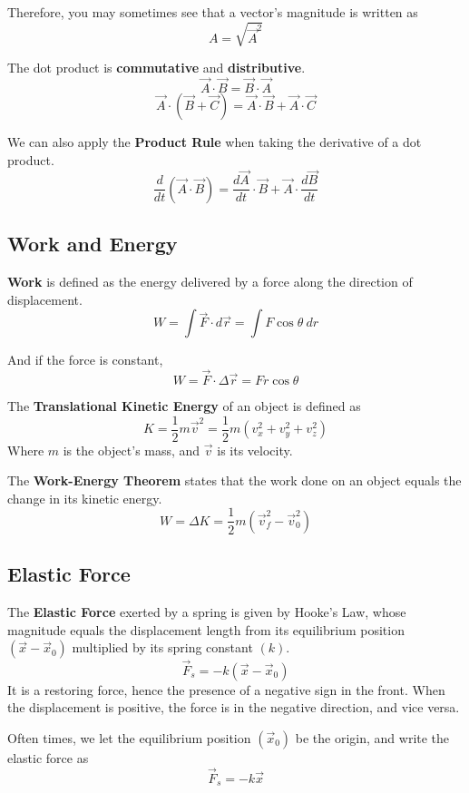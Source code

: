 \documentclass[11pt]{article}
\theoremstyle{gangnamstyle}{\newtheorem{definition}{Definition}[]}
\theoremstyle{gangnamstyle}{\newtheorem{example}{Example}[]}
\theoremstyle{gangnamstyle}{\newtheorem{problem}{Problem}[]}
\begin{document}
Therefore, you may sometimes see that a vector's magnitude is written as
\[ A = \sqrt{\Vec{A}^2} \]

The dot product is \textbf{commutative} and \textbf{distributive}. 
\[ \Vec{A} \cdot \Vec{B} = \Vec{B} \cdot \Vec{A} \]
\[ \Vec{A} \cdot (\Vec{B} + \Vec{C}) = \Vec{A} \cdot \Vec{B} + \Vec{A} \cdot \Vec{C} \]

We can also apply the \textbf{Product Rule} when taking the derivative of a dot product. 
\[ \frac{d}{dt}(\Vec{A} \cdot \Vec{B}) = \frac{d\Vec{A}}{dt} \cdot \Vec{B} + \Vec{A} \cdot \frac{d\Vec{B}}{dt} \]

\subsection{Work and Energy}

\textbf{Work} is defined as the energy delivered by a force along the direction of displacement. 
\[ W = \int \Vec{F} \cdot d\Vec{r} = \int F \cos\theta \ dr \]

And if the force is constant, 
\[ W = \Vec{F} \cdot \Delta \Vec{r} = Fr \cos\theta \]

The \textbf{Translational Kinetic Energy} of an object is defined as
\[ K = \frac{1}{2}m\Vec{v}^2 = \frac{1}{2}m(v_x^2 + v_y^2 + v_z^2) \]
Where $m$ is the object's mass, and $\Vec{v}$ is its velocity. 

The \textbf{Work-Energy Theorem} states that the work done on an object equals the change in its kinetic energy. 
\[ W = \Delta K = \frac{1}{2}m(\Vec{v}_f^2 - \Vec{v}_0^2) \]

\pagebreak

\subsection{Elastic Force}

The \textbf{Elastic Force} exerted by a spring is given by Hooke's Law, whose magnitude equals the displacement length from its equilibrium position $(\Vec{x} - \Vec{x}_0)$ multiplied by its spring constant $(k)$. 
\[ \Vec{F}_s = -k(\Vec{x} - \Vec{x}_0) \]
It is a restoring force, hence the presence of a negative sign in the front. When the displacement is positive, the force is in the negative direction, and vice versa. 

Often times, we let the equilibrium position $(\Vec{x}_0)$ be the origin, and write the elastic force as
\[ \Vec{F}_s = -k\Vec{x} \]

\pagebreak
\end{document}
